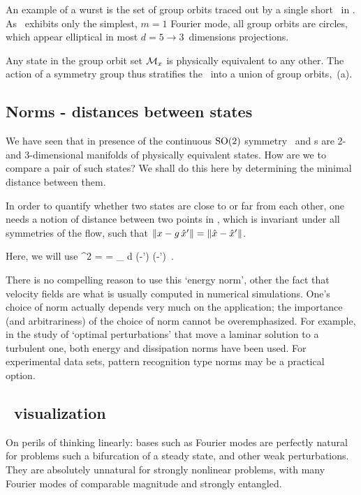 An example of a wurst is the set of group orbits traced out by a single
short \rpo\ in . As \cLe\ exhibits only the simplest,
$m=1$ Fourier mode, all group orbits are circles, which appear elliptical in
most $d=5 \to 3$~dimensions projections.
    \color{black}\fi

Any state in the  group orbit set ${\cal M}_{x}$
is physically equivalent to any other. The action of a symmetry group
thus stratifies the \statesp\ into a union of group orbits,
\,{(a)}.

\subsection{Norms - distances between states}

We have seen that in presence of the continuous $\textrm{SO}(2)$ symmetry
\reqva\ and \rpo s are 2- and 3-dimensional manifolds of physically
equivalent states. How are we to compare a pair of such states? We shall
do this here by determining the minimal distance between them.

In order to quantify
whether two states are close to or far from each other, one
needs a notion of distance between two points in \statesp, which 
is invariant under all symmetries of the flow, such that
$\|{x-g\,{\hat{x}'}}\|=\|{\hat{x}-{\hat{x}'}}\|$. 

Here, we will use
\beq
  ^2  =  =
\int_\bCell \! d \bx \;
(-') \cdot (-')
\,.

There is no compelling reason to use this {`energy norm'}, other the fact that 
velocity fields are what is usually computed in numerical simulations. One's choice
of norm actually depends very much on the application; the importance (and arbitrariness) 
of the choice of norm cannot be overemphasized. For example, in the study of 
`optimal perturbations' that move a laminar solution to a turbulent one, both energy
\citep{TeHaHe10} and dissipation \citep{LoCaCoPeGo11} norms have been
used. For experimental data sets, pattern recognition type norms may be a practical option.

\subsection{\Statesp\ visualization}

On perils of thinking linearly: bases such as Fourier modes are
perfectly natural for problems such a bifurcation of a steady state, and
other weak perturbations. They are absolutely unnatural for strongly
nonlinear problems, with many Fourier modes of comparable magnitude and
strongly entangled.

